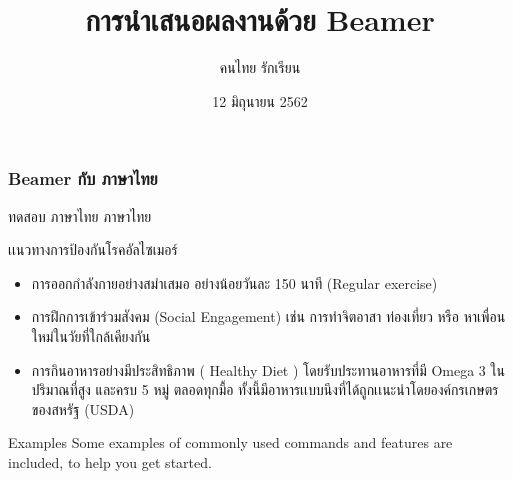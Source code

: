\documentclass[xetex,serif]{beamer}
\title{การนำเสนอผลงานด้วย Beamer}
\author{คนไทย รักเรียน}
\date{12 มิถุนายน 2562}
\institute[XUT]{มหาวิทยาลัยเทคโนโลยีซักแห่งหนึ่ง}
\begin{document}
\begin{frame}
    \maketitle
\end{frame}
\begin{frame}
    \frametitle{Beamer กับ ภาษาไทย}
    ทดสอบ ภาษาไทย ภาษาไทย
\end{frame}
\begin{frame}{เเนวทางการป้องกันโรคอัลไซเมอร์}

\begin{itemize}
  \item การออกกําลังกายอย่างสมําเสมอ อย่างน้อยวันละ 150 นาที (Regular exercise)
  \item การฝึกการเข้าร่วมสังคม (Social Engagement) เช่น การทําจิตอาสา ท่องเที่ยว หรือ หาเพื่อนใหม่ในวัยที่ใกล้เคียงกัน
  \item การกินอาหารอย่างมีประสิทธิภาพ ( Healthy Diet )  โดยรับประทานอาหารที่มี Omega 3 ในปริมาณที่สูง และครบ 5 หมู่ ตลอดทุกมื้อ ทั้งนี้มีอาหารเเบบนึงที่ได้ถูกเเนะนําโดยองค์กรเกษตรของสหรัฐ (USDA)
\end{itemize}

\begin{block}{Examples}
Some examples of commonly used commands and features are included, to help you get started.
\end{block}

\end{frame}
\end{document}
